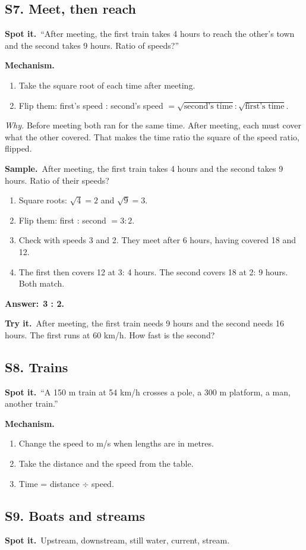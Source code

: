 \documentclass[11pt,a4paper]{article}
\let\oldsubsection\subsection
\renewcommand{\subsection}{\needspace{9\baselineskip}\oldsubsection}
\newcommand{\spot}{\textbf{\color{ember}Spot it.}\ }
\newcommand{\mech}{\textbf{\color{ember}Mechanism.}\ }
\newif\ifkeepsamp
\newcommand{\ans}[1]{\par\nopagebreak\noindent\textbf{\color{ember}Answer:}\ \textbf{#1}\par}
\newcommand{\samp}{\ifkeepsamp\needspace{4\baselineskip}\fi\textbf{\color{ember}Sample.}\ }
\newcommand{\tryit}[1]{\textbf{\color{ember}Try it.}\ #1}
\begin{document}
\subsection{S7. Meet, then reach}
\spot ``After meeting, the first train takes 4 hours to reach the other's town and the second takes 9 hours. Ratio of speeds?''

\mech
\begin{enumerate}
\item Take the square root of each time after meeting.
\item Flip them: first's speed : second's speed $=\sqrt{\text{second's time}} : \sqrt{\text{first's time}}$.
\end{enumerate}
\emph{Why.} Before meeting both ran for the same time. After meeting, each must cover what the other covered. That makes the time ratio the square of the speed ratio, flipped.

\samp After meeting, the first train takes 4 hours and the second takes 9 hours. Ratio of their speeds?
\begin{enumerate}
\item Square roots: $\sqrt{4} = 2$ and $\sqrt{9} = 3$.
\item Flip them: first : second $= 3 : 2$.
\item Check with speeds 3 and 2. They meet after 6 hours, having covered 18 and 12.
\item The first then covers 12 at 3: 4 hours. The second covers 18 at 2: 9 hours. Both match.
\end{enumerate}
\ans{3 : 2.}

\tryit After meeting, the first train needs 9 hours and the second needs 16 hours. The first runs at 60 km/h. How fast is the second?

\subsection{S8. Trains}
\spot ``A 150 m train at 54 km/h crosses a pole, a 300 m platform, a man, another train.''

\mech
\begin{enumerate}
\item Change the speed to m/s when lengths are in metres.
\item Take the distance and the speed from the table.
\item Time = distance $\div$ speed.
\end{enumerate}

\subsection{S9. Boats and streams}
\spot Upstream, downstream, still water, current, stream.
\end{document}
